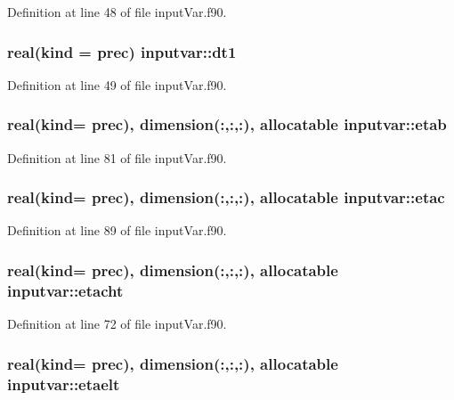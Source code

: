 Definition at line 48 of file input\-Var.\-f90.

\hypertarget{classinputvar_a62c9f9492040ef5e03091380533f2c0f}{
\subsubsection[{dt1}]{\setlength{\rightskip}{0pt plus 5cm}real(kind = prec) inputvar\-::dt1}}\label{classinputvar_a62c9f9492040ef5e03091380533f2c0f}


Definition at line 49 of file input\-Var.\-f90.

\hypertarget{classinputvar_adba062c6d3ce600124e2cd8943f7c6e6}{
\subsubsection[{etab}]{\setlength{\rightskip}{0pt plus 5cm}real(kind= prec), dimension(\-:,\-:,\-:), allocatable inputvar\-::etab}}\label{classinputvar_adba062c6d3ce600124e2cd8943f7c6e6}


Definition at line 81 of file input\-Var.\-f90.

\hypertarget{classinputvar_a3c6d7517ec3f9097a8d4264b50e61b48}{
\subsubsection[{etac}]{\setlength{\rightskip}{0pt plus 5cm}real(kind= prec), dimension(\-:,\-:,\-:), allocatable inputvar\-::etac}}\label{classinputvar_a3c6d7517ec3f9097a8d4264b50e61b48}


Definition at line 89 of file input\-Var.\-f90.

\hypertarget{classinputvar_a7cd43a0a5d5ddb8d50af96d4c4f81bea}{
\subsubsection[{etacht}]{\setlength{\rightskip}{0pt plus 5cm}real(kind= prec), dimension(\-:,\-:,\-:), allocatable inputvar\-::etacht}}\label{classinputvar_a7cd43a0a5d5ddb8d50af96d4c4f81bea}


Definition at line 72 of file input\-Var.\-f90.

\hypertarget{classinputvar_af7479b2afabbd7d596d91bb1319b0a8e}{
\subsubsection[{etaelt}]{\setlength{\rightskip}{0pt plus 5cm}real(kind= prec), dimension(\-:,\-:,\-:), allocatable inputvar\-::etaelt}}\label{classinputvar_af7479b2afabbd7d596d91bb1319b0a8e}


